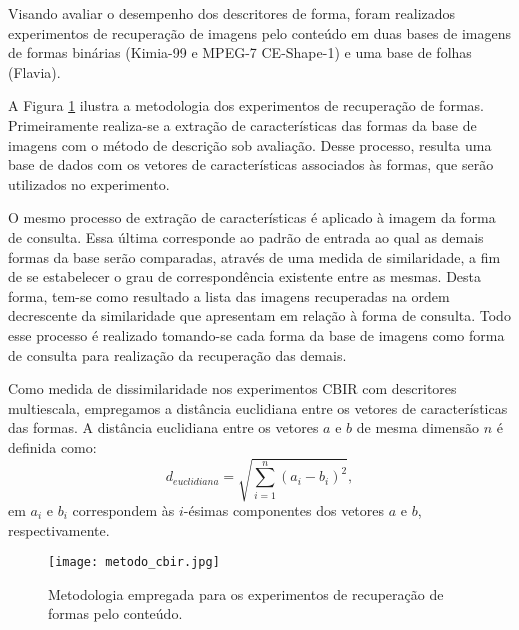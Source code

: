 Visando avaliar o desempenho dos descritores de  forma, foram realizados experimentos de recuperação de imagens pelo conteúdo em duas bases de imagens de formas binárias (Kimia-99 e MPEG-7 CE-Shape-1) e uma  base de folhas (Flavia). 

A  Figura \ref{fig:metodo_cbir} ilustra a metodologia dos experimentos de recuperação de formas.  Primeiramente realiza-se a extração de características das formas da base de imagens com o método de descrição sob avaliação. Desse processo, resulta uma base de dados com os vetores de características associados às formas, que serão utilizados no experimento. 

O mesmo processo de extração de características é aplicado à imagem da forma de consulta. Essa última corresponde ao padrão de entrada ao qual as demais formas da base serão comparadas, através de uma medida de similaridade, a fim de se estabelecer o grau de correspondência existente entre as mesmas. Desta forma, tem-se como resultado a lista das imagens recuperadas na ordem decrescente da similaridade que apresentam em relação à forma de consulta. Todo esse processo é realizado tomando-se cada forma da base de imagens como forma de consulta para realização da recuperação das demais.

Como medida de dissimilaridade nos experimentos \ac{CBIR} com descritores multiescala, empregamos a distância  euclidiana entre os vetores de características das formas. A distância euclidiana entre os vetores $a$ e $b$ de mesma dimensão $n$ é definida como: %
\begin{equation}
\label{eq:dist_euclidiana}
{d}_{euclidiana} = \sqrt{\sum_{i=1}^{n}{({a}_{i}-{b}_{i})}^{2}},
\end{equation}
em ${a}_{i}$ e ${b}_{i}$ correspondem às $i$-ésimas componentes dos vetores $a$ e $b$, respectivamente.


\begin{figure}[h!]
\caption{\label{fig:metodo_cbir} Metodologia empregada para os experimentos de recuperação de formas pelo conteúdo.}
  \centering
  \texttt{[image: metodo\_cbir.jpg]}
\end{figure}



